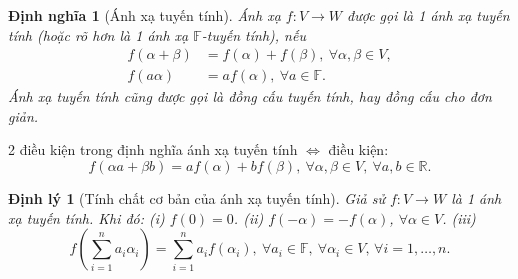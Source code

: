 \documentclass{article}
\newtheorem{dinhly}{Định lý}
\newtheorem{dinhnghia}{Định nghĩa}
\begin{document}
\begin{dinhnghia}[Ánh xạ tuyến tính]
	Ánh xạ $f:V\to W$ được gọi là 1 \emph{ánh xạ tuyến tính} (hoặc rõ hơn là 1 \emph{ánh xạ $\mathbb{F}$-tuyến tính}), nếu
	\begin{align}
		f(\alpha + \beta) &= f(\alpha) + f(\beta),\ \forall\alpha,\beta\in V,\\
		f(a\alpha) &= af(\alpha),\ \forall a\in\mathbb{F}.
	\end{align}
	Ánh xạ tuyến tính cũng được gọi là \emph{đồng cấu tuyến tính}, hay \emph{đồng cấu} cho đơn giản.
\end{dinhnghia}
2 điều kiện trong định nghĩa ánh xạ tuyến tính $\Leftrightarrow$ điều kiện:
\begin{equation}
	f(\alpha a + \beta b) = af(\alpha) + bf(\beta),\ \forall\alpha,\beta\in V,\ \forall a,b\in\mathbb{R}.
\end{equation}

\begin{dinhly}[Tính chất cơ bản của ánh xạ tuyến tính]
	Giả sử $f:V\to W$ là 1 ánh xạ tuyến tính. Khi đó: (i) $f(0) = 0$. (ii) $f(-\alpha) = -f(\alpha)$, $\forall\alpha\in V$. (iii)
	\begin{equation}
		f\left(\sum_{i=1}^n a_i\alpha_i\right) = \sum_{i=1}^n a_if(\alpha_i),\ \forall a_i\in\mathbb{F},\ \forall\alpha_i\in V,\,\forall i = 1,\ldots,n.
	\end{equation}
\end{dinhly}
\end{document}
